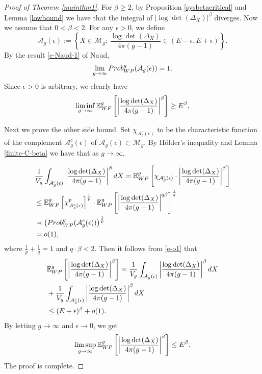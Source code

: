 \documentclass[11pt]{amsart}
\newcommand{\sM}{\mathcal{M}}
\newcommand{\eps}{\epsilon}
\newcommand{\E}{\mathbb{E}_{\rm WP}^g}
\def\Prob{\mathop{\rm Prob}\nolimits_{\rm WP}^g}
\theoremstyle{plain}
\newcommand{\be}{\begin{equation}}
\newcommand{\ene}{\end{equation}}
\theoremstyle{definition}
\theoremstyle{remark}
\begin{document}
\begin{proof}[Proof of Theorem \ref{mainthm1}]
 For $\beta\geq 2$, by Proposition \ref{sysbetacritical} and  Lemma \ref{lowbound} we have that the integral of $\left|\log \det (\Delta_X) 
 \right|^\beta$
diverges. Now we  assume that $0<\beta<2$. For any $\eps>0$, we define
$$\mathcal{A}_g(\eps):=\left\{X\in \sM_g; \ \frac{\log \det (\Delta_X)}{4\pi(g-1)}\in (E-\eps, E+\eps)\right\}.$$
By the result \eqref{e-Naud-1} of Naud,
\be
\lim\limits_{g\to \infty}\Prob(\mathcal{A}_g(\eps))=1. \nonumber
\ene
Since $\eps>0$ is arbitrary, we clearly have
\be 
\liminf\limits_{g\to\infty}\E\left[\left|\frac{\log\det(\Delta_X)}{4\pi(g-1)}\right|^\beta \right]\geq E^\beta.
\ene

\noindent Next we prove the other side bound. Set $\chi_{\mathcal{A}_g^c(\eps)}$  to be the characteristic function of the complement $\mathcal{A}_g^c(\eps)$ of  $\mathcal{A}_g(\eps)\subset \sM_g$.
By H\"older's inequality and Lemma \ref{finite-C-beta} we have that as $g\to \infty$,

\be\label{e-o1}
\begin{aligned}
&\frac{1}{V_g}\int_{\mathcal{A}_g^c(\epsilon)}\left|\frac{\log\det(\Delta_X)}{4\pi(g-1)}\right|^\beta dX=\E\left[\chi_{\mathcal{A}_g^c(\eps)}\cdot\left|\frac{\log\det(\Delta_X)}{4\pi(g-1)}\right|^\beta \right]\\
& \leq  \E\left[\chi_{\mathcal{A}_g^c(\eps)}^p\right]^{\frac{1}{p}}\cdot \E\left[ \left|\frac{\log\det(\Delta_X)}{4\pi(g-1)}\right|^{q\beta}\right]^{\frac{1}{q}}\\
&\prec \left(\Prob(\mathcal{A}_g^c(\eps))\right)^{\frac{1}{p}}\\
&=o(1),
\end{aligned}
\ene
where $\frac{1}{p}+\frac{1}{q}=1$ and $q\cdot\beta<2$. Then it follows from \eqref{e-o1} that
\be
\begin{aligned}
&\E\left[\left|\frac{\log\det(\Delta_X)}{4\pi(g-1)}\right|^\beta \right]=\frac{1}{V_g}\int_{\mathcal{A}_g(\epsilon)}\left|\frac{\log\det(\Delta_X)}{4\pi(g-1)}\right|^\beta dX\\
&+\frac{1}{V_g}\int_{\mathcal{A}_g^c(\epsilon)}\left|\frac{\log\det(\Delta_X)}{4\pi(g-1)}\right|^\beta dX \\
&\leq (E+\eps)^\beta+o(1).
\end{aligned} \nonumber
\ene
By letting $g\to \infty$ and $\eps\to 0$, we get
\be
\limsup\limits_{g\to\infty}\E\left[\left|\frac{\log\det(\Delta_X)}{4\pi(g-1)}\right|^\beta \right]\leq E^\beta.
\ene
The proof is complete.
\end{proof}
\end{document}
